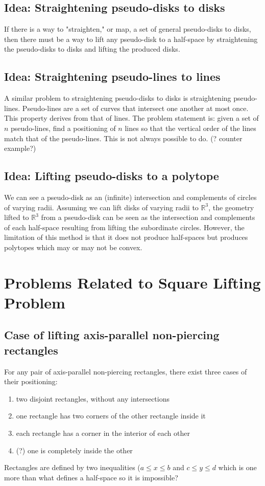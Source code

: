 \documentclass{NSF}
\begin{document}
\subsection{Idea: Straightening pseudo-disks to disks}
If there is a way to "straighten," or map, a set of general pseudo-disks to disks, then there must be a way to lift any pseudo-disk to a half-space by straightening the pseudo-disks to disks and lifting the produced disks.

\subsection{Idea: Straightening pseudo-lines to lines}
A similar problem to straightening pseudo-disks to disks is straightening pseudo-lines. Pseudo-lines are a set of curves that intersect one another at most once. This property derives from that of lines. The problem statement is:  given a set of $n$ pseudo-lines, find a positioning of $n$ lines so that the vertical order of the lines match that of the pseudo-lines. This is not always possible to do. (? counter example?)




\subsection{Idea: Lifting pseudo-disks to a polytope}
We can see a pseudo-disk as an (infinite) intersection and complements of circles of varying radii. Assuming we can lift disks of varying radii to $\mathbb{R}^3$, the geometry lifted to $\mathbb{R}^3$  from a pseudo-disk can be seen as the intersection and complements of each half-space resulting from lifting the subordinate circles. However, the limitation of this method is that it does not produce half-spaces but produces polytopes which may or may not be convex.




\section{Problems Related to Square Lifting Problem}

\subsection{Case of lifting axis-parallel non-piercing rectangles}
For any pair of axis-parallel non-piercing rectangles, there exist three cases of their positioning:
\begin{enumerate}
\item two disjoint rectangles, without any intersections
\item one rectangle has two corners of the other rectangle inside it
\item each rectangle has a corner in the interior of each other
\item (?) one is completely inside the other
\end{enumerate}
Rectangles are defined by two inequalities ($a\leq x \leq b$ and $c \leq y \leq d$ which is one more than what defines a half-space so it is impossible?
\end{document}
